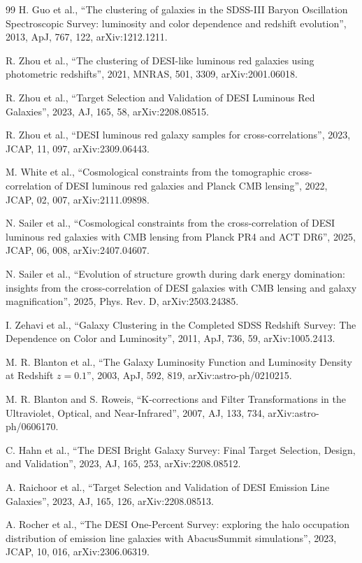 \documentclass[11pt]{article}
\begin{document}
\begin{thebibliography}{99}
H. Guo et al.,
``The clustering of galaxies in the SDSS-III Baryon Oscillation
Spectroscopic Survey: luminosity and color dependence and redshift
evolution'',
2013, ApJ, 767, 122,
arXiv:1212.1211.

R. Zhou et al.,
``The clustering of DESI-like luminous red galaxies using photometric
redshifts'',
2021, MNRAS, 501, 3309,
arXiv:2001.06018.

R. Zhou et al.,
``Target Selection and Validation of DESI Luminous Red Galaxies'',
2023, AJ, 165, 58,
arXiv:2208.08515.

R. Zhou et al.,
``DESI luminous red galaxy samples for cross-correlations'',
2023, JCAP, 11, 097,
arXiv:2309.06443.

M. White et al.,
``Cosmological constraints from the tomographic cross-correlation of
DESI luminous red galaxies and Planck CMB lensing'',
2022, JCAP, 02, 007,
arXiv:2111.09898.

N. Sailer et al.,
``Cosmological constraints from the cross-correlation of DESI
luminous red galaxies with CMB lensing from Planck PR4 and ACT DR6'',
2025, JCAP, 06, 008,
arXiv:2407.04607.

N. Sailer et al.,
``Evolution of structure growth during dark energy domination:
insights from the cross-correlation of DESI galaxies with CMB lensing
and galaxy magnification'',
2025, Phys. Rev. D,
arXiv:2503.24385.

I. Zehavi et al.,
``Galaxy Clustering in the Completed SDSS Redshift Survey: The
Dependence on Color and Luminosity'',
2011, ApJ, 736, 59,
arXiv:1005.2413.

M. R. Blanton et al.,
``The Galaxy Luminosity Function and Luminosity Density at Redshift
$z = 0.1$'',
2003, ApJ, 592, 819,
arXiv:astro-ph/0210215.

M. R. Blanton and S. Roweis,
``K-corrections and Filter Transformations in the Ultraviolet,
Optical, and Near-Infrared'',
2007, AJ, 133, 734,
arXiv:astro-ph/0606170.

C. Hahn et al.,
``The DESI Bright Galaxy Survey: Final Target Selection, Design, and
Validation'',
2023, AJ, 165, 253,
arXiv:2208.08512.

A. Raichoor et al.,
``Target Selection and Validation of DESI Emission Line Galaxies'',
2023, AJ, 165, 126,
arXiv:2208.08513.

A. Rocher et al.,
``The DESI One-Percent Survey: exploring the halo occupation
distribution of emission line galaxies with AbacusSummit
simulations'',
2023, JCAP, 10, 016,
arXiv:2306.06319.

\end{thebibliography}
\end{document}

